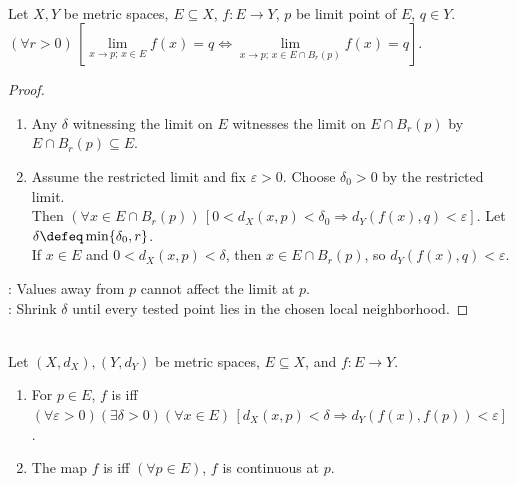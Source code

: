 \begin{proposition} \label{prop:function-limits-are-local} \\
Let $X,Y$ be metric spaces, $E\subseteq X$, $f:E\to Y$, $p$ be limit point of $E$, $q\in Y$. $(\forall r>0)\,[\lim\limits_{x\to p;\,x\in E}f(x)=q\Longleftrightarrow\lim\limits_{x\to p;\,x\in E\cap B_r(p)}f(x)=q]$.
\begin{proof}
\begin{enumerate}[label=\roman*.]
\setlength{\itemsep}{0pt}
\item[$(\Rightarrow)$] Any $\delta$ witnessing the limit on $E$ witnesses the limit on $E\cap B_r(p)$ by $E\cap B_r(p)\subseteq E$.
\item[$(\Leftarrow)$] Assume the restricted limit and fix $\varepsilon>0$. Choose $\delta_0>0$ by the restricted limit.\\
Then $(\forall x\in E\cap B_r(p))\,[0<d_X(x,p)<\delta_0\Longrightarrow d_Y(f(x),q)<\varepsilon]$. Let $\delta\defeq\min\{\delta_0,r\}$.\\
If $x\in E$ and $0<d_X(x,p)<\delta$, then $x\in E\cap B_r(p)$, so $d_Y(f(x),q)<\varepsilon$.
\end{enumerate}
: Values away from $p$ cannot affect the limit at $p$.\\
: Shrink $\delta$ until every tested point lies in the chosen local neighborhood.
\end{proof}
\end{proposition}

\begin{definition} \label{def:continuity-at-a-point-and-on-a-set} \\
Let $(X,d_X),(Y,d_Y)$ be metric spaces, $E\subseteq X$, and $f:E\to Y$.
\begin{enumerate}[label=(\roman*)]
\setlength{\itemsep}{0pt}
\item For $p\in E$, $f$ is  iff $(\forall\varepsilon>0)(\exists\delta>0)(\forall x\in E)\,[d_X(x,p)<\delta\Longrightarrow d_Y(f(x),f(p))<\varepsilon]$.
\item The map $f$ is  iff $(\forall p\in E)$, $f$ is continuous at $p$.
\end{enumerate}
\end{definition}


